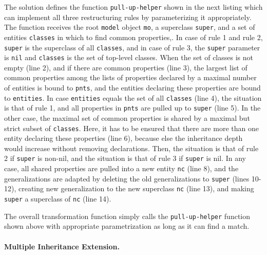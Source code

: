 \documentclass[submission]{eptcs}
\begin{document}
The solution defines the function \verb|pull-up-helper| shown in the next
listing which can implement all three restructuring rules by parameterizing it
appropriately.  The function receives the root \verb|model| object \verb|mo|, a
superclass \verb|super|, and a set of entities \verb|classes| in which to find
common properties,.  In case of rule 1 and rule 2, \verb|super| is the
superclass of all \verb|classes|, and in case of rule 3, the \verb|super|
parameter is \verb|nil| and \verb|classes| is the set of top-level classes.
 When the set of classes is not empty (line 2), and if there are
common properties (line 3), the largest list of common properties among the
lists of properties declared by a maximal number of entities is bound to
\verb|pnts|, and the entities declaring these properties are bound to
\verb|entities|.  In case \verb|entities| equals the set of all \verb|classes|
(line 4), the situation is that of rule 1, and all properties in \verb|pnts|
are pulled up to \verb|super| (line 5).  In the other case, the maximal set of
common properties is shared by a maximal but strict subset of \verb|classes|.
Here, it has to be ensured that there are more than one entity declaring these
properties (line 6), because else the inheritance depth would increase without
removing declarations.  Then, the situation is that of rule 2 if \verb|super|
is non-nil, and the situation is that of rule 3 if \verb|super| is nil.  In any
case, all shared properties are pulled into a new entity \verb|nc| (line 8),
and the generalizations are adapted by deleting the old generalizations to
\verb|super| (lines 10-12), creating new generalization to the new superclass
\verb|nc| (line 13), and making \verb|super| a superclass of \verb|nc| (line
14).

The overall transformation function simply calls the \verb|pull-up-helper|
function shown above with appropriate parametrization as long as it can find a
match.


\paragraph{Multiple Inheritance Extension.}
\end{document}
